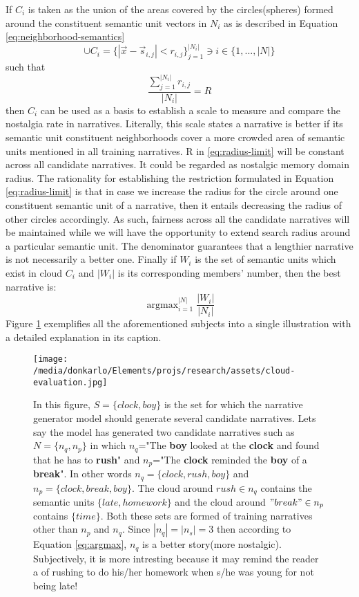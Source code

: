 \documentclass{article}
\DeclareMathOperator*{\argmax}{argmax}
\begin{document}
	If $C_i$ is taken as the union of the areas covered by the circles(spheres) formed around the constituent semantic unit vectors in $N_i$ as is described in Equation \ref{eq:neighborhood-semantics}
	\begin{equation}
		\cup C_i = \{|\vec{x}-\vec{s}_{i,j}|<{r_{i,j}}\}_{j=1}^{|N_i|} \ni i \in \{1,...,|N|\}
		\label{eq:neighborhood-semantics}
	\end{equation}
	such that 
	\begin{equation}
		\frac{\sum_{j=1}^{|N_i|}r_{i,j}}{|N_i|} = R
		\label{eq:radius-limit}
	\end{equation}
	then $C_i$ can be used as a basis to establish a scale to measure and compare the nostalgia rate in narratives. Literally, this  scale states a narrative is better if its semantic unit constituent neighborhoods cover a more crowded area of semantic units mentioned in all training narratives. R in \ref{eq:radius-limit} will be constant across all candidate narratives. It could be regarded as nostalgic memory domain radius. The rationality for establishing the restriction formulated in Equation \ref{eq:radius-limit} is that in case we increase the radius for the circle around one constituent semantic unit of a narrative, then it entails decreasing the radius of other circles accordingly. As such, fairness across all the candidate narratives will be maintained while we will have the opportunity to extend search radius around a particular semantic unit. The denominator guarantees that a lengthier narrative is not necessarily a better one. Finally if $W_i$ is the set of semantic units which exist in cloud $C_i$ and $|W_i|$ is its corresponding members' number, then the best narrative is: 
	\begin{equation}
	\argmax_{i=1}^{|N|} \frac{|W_i|}{|N_i|}
	\label{eq:argmax}
	\end{equation}
	Figure \ref{fig:clouds-around-two-candidate-stories} exemplifies all the aforementioned subjects into a single illustration with a detailed explanation in its caption.  
	\begin{figure}[h!]
		\centering
		\texttt{[image: /media/donkarlo/Elements/projs/research/assets/cloud-evaluation.jpg]}
		\caption{In this figure, $S=\{clock,boy\}$ is the set for which the narrative generator model should generate several candidate narratives. Lets say the model has generated two candidate narratives such as $N=\{n_q,n_p\}$ in which $n_q$="The \textbf{boy} looked at the \textbf{clock} and found that he has to \textbf{rush}" and $n_p$="The \textbf{clock} reminded the \textbf{boy} of a \textbf{break}". In other words $n_q=\{clock,rush,boy\}$ and $n_p=\{clock,break,boy\}$. The cloud around ${rush} \in n_q$ contains the semantic units $\{late,homework\}$ and the cloud around $"break" \in n_p$ contains $\{time\}$. Both these sets are formed of training narratives other than $n_p$ and $n_q$. Since $|n_q|=|n_s|=3$ then according to Equation \ref{eq:argmax}, $n_q$ is a better story(more nostalgic). Subjectively, it is more intresting because it may remind the reader a of rushing to do his/her homework when s/he was young for not being late!} 
		\label{fig:clouds-around-two-candidate-stories}
	\end{figure}
	
\end{document}
